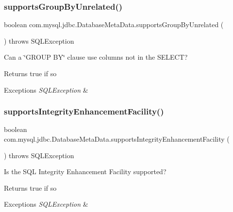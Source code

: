 \subsubsection{\texorpdfstring{supports\+Group\+By\+Unrelated()}{supportsGroupByUnrelated()}}
{\footnotesize\ttfamily boolean com.\+mysql.\+jdbc.\+Database\+Meta\+Data.\+supports\+Group\+By\+Unrelated (\begin{DoxyParamCaption}{ }\end{DoxyParamCaption}) throws S\+Q\+L\+Exception}

Can a \char`\"{}\+G\+R\+O\+U\+P B\+Y\char`\"{} clause use columns not in the S\+E\+L\+E\+CT?

\begin{DoxyReturn}{Returns}
true if so 
\end{DoxyReturn}

\begin{DoxyExceptions}{Exceptions}
{\em S\+Q\+L\+Exception} & \\
\hline
\end{DoxyExceptions}
\mbox{\label{classcom_1_1mysql_1_1jdbc_1_1_database_meta_data_aaed7a682d01435e4df3246e3c2f4bcc2}} 
\subsubsection{\texorpdfstring{supports\+Integrity\+Enhancement\+Facility()}{supportsIntegrityEnhancementFacility()}}
{\footnotesize\ttfamily boolean com.\+mysql.\+jdbc.\+Database\+Meta\+Data.\+supports\+Integrity\+Enhancement\+Facility (\begin{DoxyParamCaption}{ }\end{DoxyParamCaption}) throws S\+Q\+L\+Exception}

Is the S\+QL Integrity Enhancement Facility supported?

\begin{DoxyReturn}{Returns}
true if so 
\end{DoxyReturn}

\begin{DoxyExceptions}{Exceptions}
{\em S\+Q\+L\+Exception} & \\
\hline
\end{DoxyExceptions}
\mbox{\label{classcom_1_1mysql_1_1jdbc_1_1_database_meta_data_a5a57fbcc91beaca2eceedb46f41cc2ca}} 
